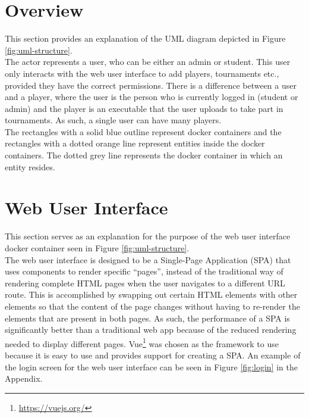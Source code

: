 \documentclass[a4paper, 11pt]{report}
\begin{document}
\section{Overview}
\label{sec:impl-overview}

This section provides an explanation of the UML diagram depicted in Figure
\ref{fig:uml-structure}. \\

The actor represents a user, who can be either an admin or student. This user
only interacts with the web user interface to add players, tournaments etc.,
provided they have the correct permissions. There is a difference between a
user and a player, where the user is the person who is currently logged in
(student or admin) and the player is an executable that the user uploads to take
part in tournaments. As such, a single user can have many players. \\

The rectangles with a solid blue outline represent docker containers and the
rectangles with a dotted orange line represent entities inside the docker
containers. The dotted grey line represents the docker container in which an
entity resides.

\section{Web User Interface}
\label{sec:impl-web-interface}

This section serves as an explanation for the purpose of the web user interface
docker container seen in Figure \ref{fig:uml-structure}. \\

The web user interface is designed to be a Single-Page Application (SPA) that
uses components to render specific ``pages'', instead of the traditional way of
rendering complete HTML pages when the user navigates to a different URL route.
This is accomplished by swapping out certain HTML elements with other elements
so that the content of the page changes without having to re-render the elements
that are present in both pages. As such, the performance of a SPA is significantly
better than a traditional web app because of the reduced rendering needed to
display different pages. Vue\footnote{\url{https://vuejs.org/}} was chosen as the
framework to use because it is easy to use and provides support for creating a
SPA. An example of the login screen for the web user interface can be seen in
Figure \ref{fig:login} in the Appendix. \\
\end{document}
